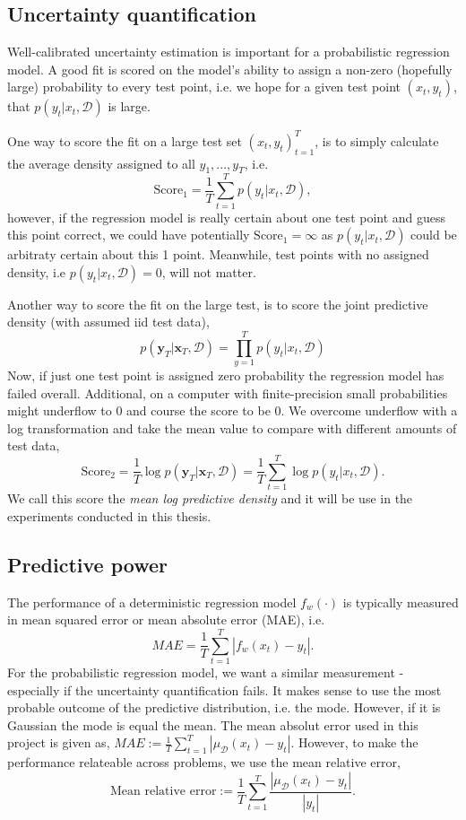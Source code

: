  \subsection{Uncertainty quantification}\label{UQ_score}
Well-calibrated uncertainty estimation is important for a probabilistic regression model. A good fit is
scored on the model's ability to assign a non-zero (hopefully large) probability to every test point, i.e.
we hope for a given test point $(x_t, y_t)$, that $p(y_t|x_t,\mathcal{D})$ is large. 

One way to score the fit on a large test set $(x_t, y_t)_{t=1}^T$, is to simply calculate the average
density assigned to all $y_1, ..., y_T$, i.e. 
$$\text{Score}_1  = \frac{1}{T}\sum_{t=1}^T p(y_t|x_t,\mathcal{D}),$$ 
however, if the regression model is really certain about one test point and guess this point correct,  
we could have potentially $\text{Score}_1 = \infty$ as $ p(y_t|x_t,\mathcal{D})$ could be arbitraty certain about this 
1 point. Meanwhile, test points with no assigned density, i.e $p(y_t|x_t,\mathcal{D}) = 0$, will not matter. 

Another way to score the fit on the large test, is to score the joint predictive density (with assumed iid 
test data), 
$$p(\textbf{y}_T|\textbf{x}_T, \mathcal{D}) = \prod_{y=1}^T p(y_t|x_t, \mathcal{D})$$
Now, if just one test point is assigned zero probability the regression model has failed overall. 
Additional, on a computer with finite-precision small probabilities might underflow to 0 and course
the score to be 0. We overcome underflow with a log transformation and take the mean value to 
compare with different amounts of test data,
$$ \text{Score}_2 = \frac{1}{T} \log p(\textbf{y}_T|\textbf{x}_T, \mathcal{D}) = \frac{1}{T}\sum_{t=1}^T \log p(y_t|x_t, \mathcal{D}).$$
We call this score the \textit{mean log predictive density} and it will be use in the experiments conducted in this thesis. 

\subsection{Predictive power}
The performance of a deterministic regression model $f_w(\cdot)$ is typically measured in mean squared error or 
mean absolute error (MAE), i.e. 
$$MAE = \frac{1}{T}\sum_{t=1}^T |f_{w}(x_t) - y_t|.$$ For the probabilistic regression model, we
want a similar measurement - especially if the uncertainty quantification fails. It makes sense to use
the most probable outcome of the predictive distribution, i.e. the mode. However, if it is Gaussian
the mode is equal the mean. The mean absolut error used in this project is given as, 
$MAE :=\frac{1}{T}\sum_{t=1}^T |\mu_{\mathcal{D}}(x_t) - y_t|.$ However, to make the performance
relateable across problems, we use the mean relative error, 
$$\text{Mean relative error} :=\frac{1}{T}\sum_{t=1}^T \frac{|\mu_{\mathcal{D}}(x_t) - y_t|}{|y_t|}.$$

